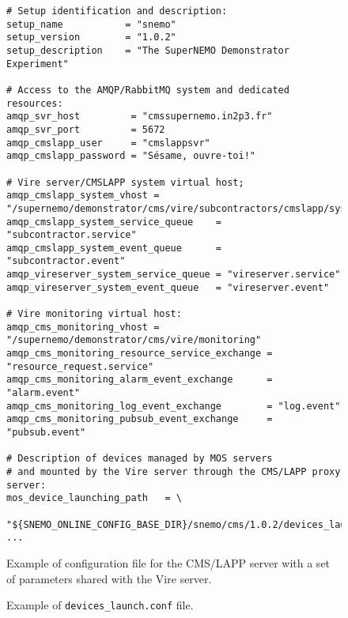 \begin{figure}[h]
\small
\begin{Verbatim}[frame=single,xleftmargin=0.cm,label=\fbox{Configuration}]
# Setup identification and description:
setup_name           = "snemo"
setup_version        = "1.0.2"
setup_description    = "The SuperNEMO Demonstrator Experiment"

# Access to the AMQP/RabbitMQ system and dedicated resources:
amqp_svr_host         = "cmssupernemo.in2p3.fr"
amqp_svr_port         = 5672
amqp_cmslapp_user     = "cmslappsvr"
amqp_cmslapp_password = "Sésame, ouvre-toi!"

# Vire server/CMSLAPP system virtual host;
amqp_cmslapp_system_vhost = "/supernemo/demonstrator/cms/vire/subcontractors/cmslapp/system"
amqp_cmslapp_system_service_queue    = "subcontractor.service"
amqp_cmslapp_system_event_queue      = "subcontractor.event"
amqp_vireserver_system_service_queue = "vireserver.service"
amqp_vireserver_system_event_queue   = "vireserver.event"

# Vire monitoring virtual host:
amqp_cms_monitoring_vhost = "/supernemo/demonstrator/cms/vire/monitoring"
amqp_cms_monitoring_resource_service_exchange = "resource_request.service"
amqp_cms_monitoring_alarm_event_exchange      = "alarm.event"
amqp_cms_monitoring_log_event_exchange        = "log.event"
amqp_cms_monitoring_pubsub_event_exchange     = "pubsub.event"

# Description of devices managed by MOS servers
# and mounted by the Vire server through the CMS/LAPP proxy server:
mos_device_launching_path   = \
  "${SNEMO_ONLINE_CONFIG_BASE_DIR}/snemo/cms/1.0.2/devices_launch.conf"
...
\end{Verbatim}
\normalsize
\caption{Example of configuration file for  the CMS/LAPP server with a
  set      of      parameters      shared      with      the      Vire
  server.}\label{fig:setup_conf}
\end{figure}


\begin{figure}[p]
  \begin{center}
  \end{center}
  \caption{Example of \texttt{devices\_launch.conf} file.}
  \label{fig:cmslapp_server:dev_launch_conf}
\end{figure}


\vfill
\afterpage{\clearpage}
\pagebreak
